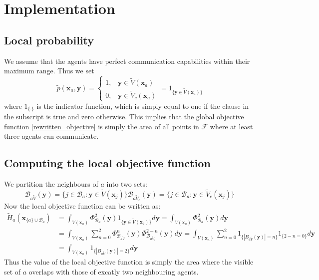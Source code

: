 \section{Implementation}
\subsection{Local probability}
We assume that the agents have perfect communication capabilities within their maximum range. Thus we set
\begin{equation}
  \tilde{p}(\mathbf{x}_{a}, \mathbf{y}) = \begin{cases}
    1, &\mathbf{y}\in\tilde{V}(\mathbf{x}_{a})\\
    0, &\mathbf{y}\in\tilde{V}_{c}(\mathbf{x}_{a})
  \end{cases} = 1_{\big\{\mathbf{y}\in\tilde{V}(\mathbf{x}_{a})\big\}}
\end{equation}
where $1_{\{\cdot\}}$ is the indicator function, which is simply equal to one if the clause in the subscript is true and zero otherwise.
This implies that the global objective function \eqref{rewritten_objective} is simply the area of all points in $\mathcal{F}$ where at least three agents can communicate.

\subsection{Computing the local objective function}
We partition the neighbours of $a$ into two sets:
\begin{subequations}
  \begin{equation}
    \mathcal{B}_{a\tilde{V}}(\mathbf{y}) = \{j\in\mathcal{B}_{a}: \mathbf{y}\in\tilde{V}(\mathbf{x}_{j})\}
  \end{equation}
  \begin{equation}
    \mathcal{B}_{a\tilde{V}_{c}}(\mathbf{y}) = \{j\in\mathcal{B}_{a}: \mathbf{y}\in\tilde{V}_{c}(\mathbf{x}_{j})\}
  \end{equation}
\end{subequations}
Now the local objective function can be written as:
\begin{equation}
  \begin{split}
    \tilde{H}_{a}(\mathbf{x}_{\{a\}\cup\mathcal{B}_{a}}) &= \int_{V(\mathbf{x}_{a})}\Phi^{2}_{\mathcal{B}_{a}}(\mathbf{y})1_{\{\mathbf{y}\in\tilde{V}(\mathbf{x}_{a})\}}d\mathbf{y} = \int_{V(\mathbf{x}_{a})}\Phi^{2}_{\mathcal{B}_{a}}(\mathbf{y})d\mathbf{y}\\
    &= \int_{V(\mathbf{x}_{a})}\sum_{n = 0}^{2} \Phi^{n}_{\mathcal{B}_{a\tilde{V}}}(\mathbf{y})\Phi^{2-n}_{\mathcal{B}_{a\tilde{V}_{c}}}(\mathbf{y})d\mathbf{y} = \int_{V(\mathbf{x}_{a})}\sum_{n = 0}^{2}1_{\{|B_{a\tilde{V}}(\mathbf{y})| = n\}}1_{\{2-n = 0\}}d\mathbf{y}\\
    &= \int_{V(\mathbf{x}_{a})}1_{\{|B_{a\tilde{V}}(\mathbf{y})| = 2\}}d\mathbf{y}
  \end{split}
\end{equation}
Thus the value of the local objective function is simply the area where the visible set of $a$ overlaps with those of excatly two neighbouring agents.